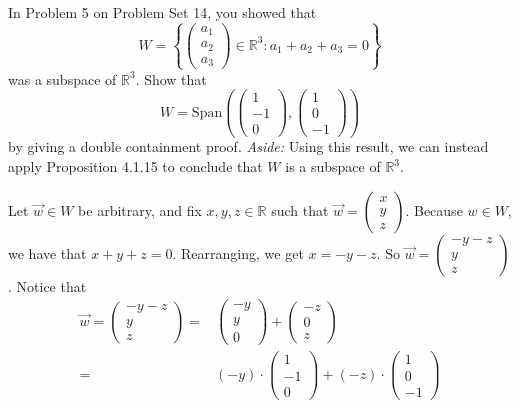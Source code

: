 \documentclass[12pt]{article}
\newenvironment{problem}[2][Problem]
{
	\begin{trivlist} 
		\item[\hskip \labelsep {\bfseries #1 #2:}]
	}
{
	\end{trivlist}
	}
\newenvironment{solution}[1][Solution]
{
	\begin{trivlist} 
		\item[\hskip \labelsep {\itshape #1:}]
	}
	{
	\end{trivlist}
}
\begin{document}
\newpage
\begin{problem}{6}
In Problem 5 on Problem Set 14, you showed that
\[
W=\left\{\begin{pmatrix}a_1\\a_2\\a_3\end{pmatrix} \in \mathbb{R}^3 : a_1+a_2+a_3 =0 \right\}
\]
was a subspace of $\mathbb{R}^3$. Show that
\[
W=\text{Span}\left(\begin{pmatrix}1\\-1\\0\end{pmatrix}, \begin{pmatrix}1\\0\\-1\end{pmatrix}\right)
\]
by giving a double containment proof.
\newline
\noindent
{\it Aside:} Using this result, we can instead apply Proposition 4.1.15 to conclude that $W$ is a subspace of $\mathbb{R}^3$.
\noindent
\newline
\newline
\begin{solution}
Let $\vec{w} \in W$ be arbitrary, and fix $x,y,z \in \mathbb{R}$ such that $\vec{w} = \begin{pmatrix}x\\y\\z\end{pmatrix}$. Because $w \in W$, we have that $x+y+z =0$. Rearranging, we get $x= -y-z$. So $\vec{w} = \begin{pmatrix}-y-z\\y\\z\end{pmatrix}$. Notice that
\begin{align*}
\vec{w}=\begin{pmatrix}-y-z\\y\\z \end{pmatrix} =& \begin{pmatrix}-y\\y\\0\end{pmatrix} + \begin{pmatrix}-z\\0\\z\end{pmatrix}\\
=&(-y)\cdot \begin{pmatrix}1\\-1\\0\end{pmatrix} + (-z)\cdot\begin{pmatrix}1\\0\\-1\end{pmatrix}

\end{align*}
\end{solution}
\end{problem}
\end{document}
